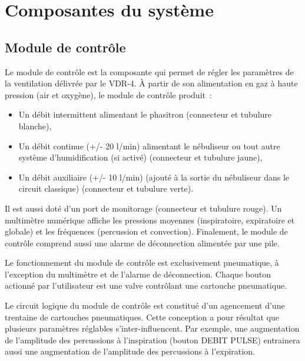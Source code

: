 \chapter{Composantes du système}

\section{Module de contrôle}

Le module de contrôle est la composante qui permet de régler les paramètres de
la ventilation délivrée par le VDR-4.  À partir de son alimentation en gaz à
haute pression (air et oxygène), le module de contrôle produit :

\begin{itemize}
	\item Un débit intermittent alimentant le phasitron (connecteur et tubulure blanche),
	\item Un débit continue (+/- 20 l/min) alimentant le nébuliseur ou tout autre système d’humidification (si activé) (connecteur et tubulure jaune),
	\item Un débit auxiliaire (+/- 10 l/min) (ajouté à la sortie du nébuliseur dans le circuit classique) (connecteur et tubulure verte).
\end{itemize}

Il est aussi doté d’un port de monitorage (connecteur et tubulure rouge). 
Un multimètre numérique affiche les pressions moyennes (inspiratoire,
expiratoire et globale) et les fréquences (percussion et convection).
Finalement, le module de contrôle comprend aussi une alarme de déconnection
alimentée par une pile.

Le fonctionnement du module de contrôle est exclusivement pneumatique, à
l’exception du multimètre et de l’alarme de déconnection.  Chaque bouton
actionné par l’utilisateur est une valve contrôlant une cartouche pneumatique. 

Le circuit logique du module de contrôle est constitué d’un agencement d’une
trentaine de cartouches pneumatiques.  Cette conception a pour résultat que
plusieurs paramètres réglables s’inter-influencent.  Par exemple, une
augmentation de l’amplitude des percussions à l’inspiration (bouton DEBIT PULSE)
entrainera aussi une augmentation  de l’amplitude des percussions à
l’expiration.


